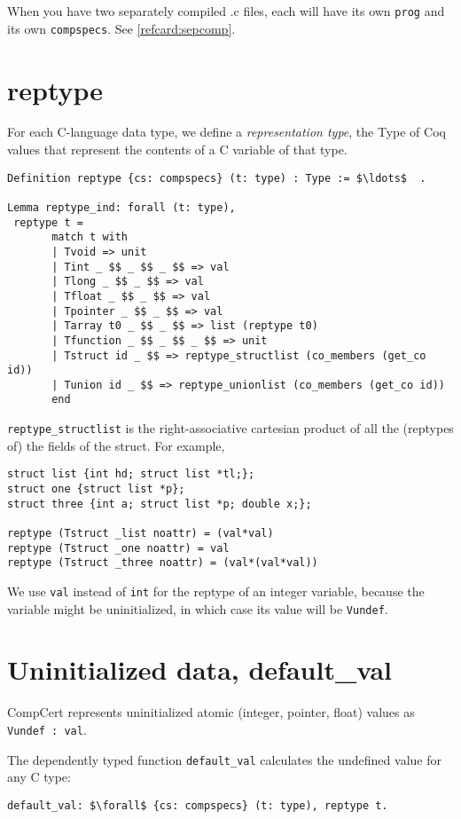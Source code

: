 \documentclass[12pt,fleqn,openany,oneside,showtrims]{memoir}
\begin{document}
When you have two separately compiled .c files,
each will have its own \lstinline{prog} and its own
\lstinline{compspecs}.  See \autoref{refcard:sepcomp}.



\chapter{\upshape\textsf{reptype}}
\label{refcard:reptype}
For each C-language data type, we define a
\emph{representation type}, the Type of Coq values
that represent the contents of a C variable of that type.
\begin{lstlisting}
Definition reptype {cs: compspecs} (t: type) : Type := $\ldots$  .

Lemma reptype_ind: forall (t: type),
 reptype t =
       match t with
       | Tvoid => unit
       | Tint _ $$ _ $$ _ $$ => val
       | Tlong _ $$ _ $$ => val
       | Tfloat _ $$ _ $$ => val
       | Tpointer _ $$ _ $$ => val
       | Tarray t0 _ $$ _ $$ => list (reptype t0)
       | Tfunction _ $$ _ $$ _ $$ => unit
       | Tstruct id _ $$ => reptype_structlist (co_members (get_co id))
       | Tunion id _ $$ => reptype_unionlist (co_members (get_co id))
       end
\end{lstlisting}

\lstinline{reptype_structlist} is the right-associative cartesian product of
all the (reptypes of) the fields of the struct.  For example,

\begin{lstlisting}
struct list {int hd; struct list *tl;};
struct one {struct list *p};
struct three {int a; struct list *p; double x;};

reptype (Tstruct _list noattr) = (val*val)
reptype (Tstruct _one noattr) = val
reptype (Tstruct _three noattr) = (val*(val*val))
\end{lstlisting}
We use \lstinline{val} instead of \lstinline{int} for the reptype
of an integer variable, because the variable might be uninitialized,
in which case its value will be \lstinline{Vundef}.

\chapter{Uninitialized data, \upshape\textsf{default\_val}}
CompCert represents uninitialized atomic (integer, pointer, float) values
as \lstinline{Vundef : val}.

The dependently typed function \lstinline{default_val}
calculates the undefined value for any C type:
\begin{lstlisting}
default_val: $\forall$ {cs: compspecs} (t: type), reptype t.
\end{lstlisting}
\end{document}
